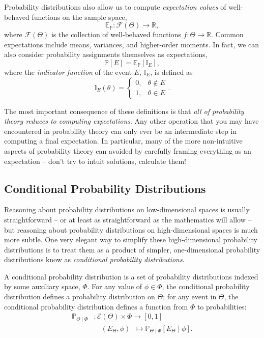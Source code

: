 \documentclass[11pt, oneside]{article}
\newcommand{\PP}{ \mathbb{P} }
\newcommand{\EE}{ \mathbb{E} }
\newcommand{\EV}[1]{\ensuremath { \mathcal{E} \! \left( #1 \right)  } }
\begin{document}
Probability distributions also allow us to compute \emph{expectation values} 
of well-behaved functions on the sample space,
%
\begin{equation*}
\EE_{\PP} : \mathcal{F} \! \left( \Theta \right) \rightarrow \mathbb{R},
\end{equation*}
%
where $\mathcal{F} \! \left( \Theta \right)$ is the collection of well-behaved 
functions $f : \Theta \rightarrow \mathbb{R}$.  Common expectations 
include means, variances, and higher-order moments.  In fact, we
can also consider probability assignments themselves as expectations,
%
\begin{equation*}
\PP \! \left[ E \right] = \EE_{\PP} \! \left[ \mathbb{I}_{E} \right],
\end{equation*}
%
where the \emph{indicator function} of the event $E$, $\mathbb{I}_{E}$,
is defined as
%
\begin{equation*}
\mathbb{I}_{E} \! \left( \theta \right)
= 
\left\{
\begin{array}{rr}
0, & \theta \notin E \\
1, & \theta \in E
\end{array}
\right. .
\end{equation*}

The most important consequence of these definitions is that \emph{all of 
probability theory reduces to computing expectations}.  Any other operation 
that you may have encountered in probability theory can only ever be an
intermediate step in computing a final expectation.  In particular, many of 
the more non-intuitive aspects of probability theory can avoided by carefully
framing everything as an expectation -- don't try to intuit solutions, calculate 
them!

\subsection{Conditional Probability Distributions}

Reasoning about probability distributions on low-dimensional spaces
is usually straightforward -- or at least as straightforward as the
mathematics will allow -- but reasoning about probability distributions
on high-dimensional spaces is much more subtle.  One
very elegant way to simplify these high-dimensional probability
distributions is to treat them as a product of simpler, one-dimensional
probability distributions know as \emph{conditional probability
distributions}.

A conditional probability distribution is a set of probability distributions 
indexed by some auxiliary space, $\Phi$. For any value of $\phi \in \Phi$, 
the conditional probability distribution defines a probability distribution on 
$\Theta$; for any event in $\Theta$, the conditional probability 
distribution defines a function from $\Phi$ to probabilities:
%
\begin{align*}
\PP_{\Theta \mid \Phi} 
&: \EV{\Theta} \times \Phi \rightarrow \left[0, 1 \right] \\
&\quad \left( E_{\Theta}, \phi \right) \;\; \mapsto 
\PP_{\Theta \mid \Phi} \! \left[ E_{\Theta} \mid \phi \right].
\end{align*}
\end{document}
